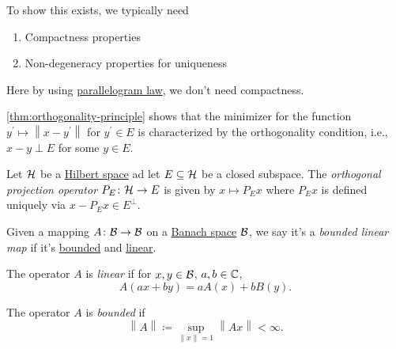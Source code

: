 \begin{note}
	To show this exists, we typically need
	\begin{enumerate}
		\item Compactness properties
		\item Non-degeneracy properties for uniqueness
	\end{enumerate}
	Here by using \hyperref[lma:parallelogram-law]{parallelogram law}, we don't need compactness.
\end{note}

\begin{remark}
	\autoref{thm:orthogonality-principle} shows that the minimizer for the function \(y^\prime \mapsto \left\lVert x - y^\prime \right\rVert \) for \(y^\prime \in E\) is characterized by the orthogonality condition, i.e., \(x - y\perp E\) for some \(y\in E\).
\end{remark}

\begin{definition}\label{def:orthogonal-projection}
	Let \(\mathcal{\MakeUppercase{h}} \) be a \hyperref[def:Hilbert-space]{Hilbert space} ad let \(E\subseteq \mathcal{\MakeUppercase{h}} \) be a closed subspace. The \emph{orthogonal projection operator} \(P_E\colon \mathcal{\MakeUppercase{h}} \to E\) is given by \(x \mapsto P_E x\) where \(P_E x\) is defined uniquely via \(x - P_E x\in E^\perp\).
\end{definition}

\begin{definition}\label{def:bounded-linear-map}
	Given a mapping \(A\colon \mathcal{\MakeUppercase{b}} \to \mathcal{\MakeUppercase{b}} \) on a \hyperref[def:Banach-space]{Banach space} \(\mathcal{\MakeUppercase{b}} \), we say it's a \emph{bounded linear map} if it's \hyperref[def:bounded-map]{bounded} and \hyperref[def:linear-map]{linear}.

	\begin{definition}\label{def:linear-map}
		The operator \(A\) is \emph{linear} if for \(x, y\in \mathcal{\MakeUppercase{b}} \), \(a, b\in \mathbb{\MakeUppercase{c}} \),
		\[
			A(ax + by) = a A(x) + b B(y).
		\]
	\end{definition}

	\begin{definition}\label{def:bounded-map}
		The operator \(A\) is \emph{bounded} if
		\[
			\left\lVert A\right\rVert \coloneqq \sup _{\left\lVert x\right\rVert = 1} \left\lVert Ax\right\rVert < \infty.
		\]
	\end{definition}
\end{definition}

